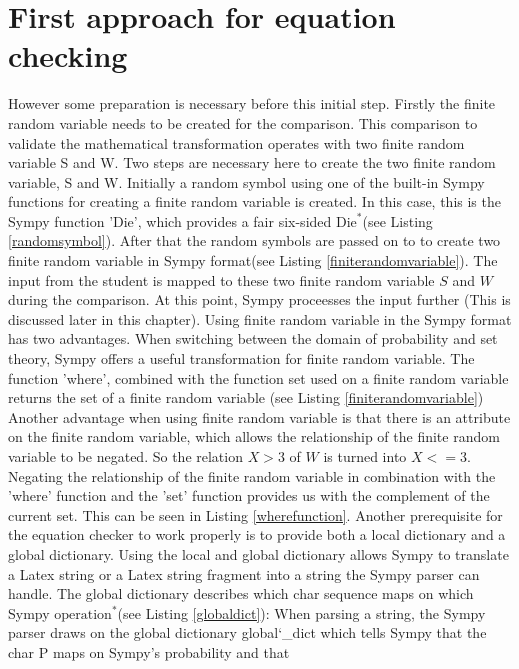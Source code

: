         \section{First approach for equation checking}
        However some preparation is necessary before this initial step. Firstly the finite random variable needs to be created for the comparison. This comparison to validate the mathematical transformation
        operates with two finite random variable S and W. Two steps are necessary here to create the two finite random variable, S and W. Initially a random symbol
        using one of the built-in Sympy functions for creating a finite random variable is created. In this case, this is the Sympy function 'Die',
        which provides a fair six-sided $\text{Die}^{\ast}$(see Listing \ref{randomsymbol}).
        After that the random symbols are passed on to to create two finite random variable in Sympy format(see Listing \ref{finiterandomvariable}).
        The input from the student is mapped to these two finite random variable $S$ and $W$ during the comparison. At this point, Sympy proceesses the input further (This is discussed later in this chapter).
        Using finite random variable in the Sympy format has two advantages. When switching between the domain of probability and set theory, Sympy offers a useful transformation for
        finite random variable. The function 'where', combined with the function set used on a finite random variable returns the set of a finite random variable (see Listing \ref{finiterandomvariable})
        Another advantage when using finite random variable is that there is an attribute on the finite random variable, which allows the relationship of the finite random variable to be negated.
        So the relation $X > 3$ of $W$ is turned into $X <= 3$. Negating the relationship of the finite random variable in combination
        with the 'where' function and the 'set' function provides us with the complement of the current set. This can be seen in Listing \ref{wherefunction}.
        Another prerequisite for the equation checker to work properly is to provide both a local dictionary and a global dictionary. Using the local and global dictionary allows
        Sympy to translate a Latex string or a Latex string fragment into a string the Sympy parser can handle. The global dictionary describes which char sequence maps on which
        Sympy $\text{operation}^{\ast}$(see Listing \ref{globaldict}):
        When parsing a string, the Sympy parser draws on the global dictionary global\char`_dict which tells Sympy that the char P maps on Sympy's probability and that
